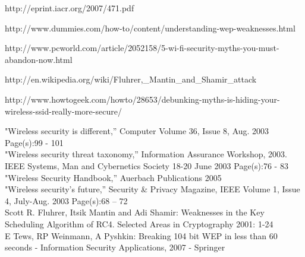 \documentclass[a4paper,12pt,pagesize,headsepline,bibtotoc,titlepage]{scrartcl}
\begin{document}
\begin{thebibliography}{1}

http://eprint.iacr.org/2007/471.pdf

http://www.dummies.com/how-to/content/understanding-wep-weaknesses.html

http://www.pcworld.com/article/2052158/5-wi-fi-security-myths-you-must-abandon-now.html

http://en.wikipedia.org/wiki/Fluhrer,_Mantin_and_Shamir_attack

http://www.howtogeek.com/howto/28653/debunking-myths-is-hiding-your-wireless-ssid-really-more-secure/

"Wireless security is different,” Computer Volume 36, Issue 8, Aug. 2003 Page(s):99 - 101\\

"Wireless security threat taxonomy,” Information Assurance Workshop, 2003. IEEE Systems, Man and Cybernetics Society 18-20 June 2003 Page(s):76 - 83\\

"Wireless Security Handbook,” Auerbach Publications 2005\\

"Wireless security's future,” Security \& Privacy Magazine, IEEE Volume 1, Issue 4, July-Aug. 2003 Page(s):68 – 72\\

 Scott R. Fluhrer, Itsik Mantin and Adi Shamir: Weaknesses in the Key Scheduling Algorithm of RC4. Selected Areas in Cryptography 2001: 1-24\\

 E Tews, RP Weinmann, A Pyshkin: Breaking 104 bit WEP in less than 60 seconds - Information Security Applications, 2007 - Springer\\
\end{thebibliography}
\end{document}
